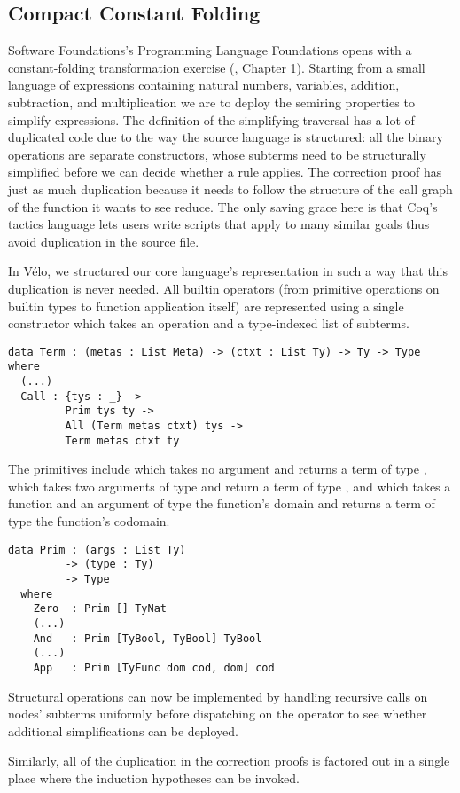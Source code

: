 \subsection{Compact Constant Folding}
\label{sec:design:constants}

Software Foundations's Programming Language Foundations
opens with a constant-folding transformation
exercise (\cite{Pierce:SF2}, Chapter 1).
%
Starting from a small language of expressions containing natural numbers,
variables, addition, subtraction, and multiplication we are to deploy the
semiring properties to simplify expressions.
%
The definition of the simplifying traversal has a lot of duplicated code
due to the way the source language is structured: all the binary operations
are separate constructors, whose subterms need to be structurally simplified
before we can decide whether a rule applies.
%
The correction proof has just as much duplication because it needs to follow
the structure of the call graph of the function it wants to see reduce.
%
The only saving grace here is that Coq's tactics language lets users write
scripts that apply to many similar goals thus avoid duplication in the source
file.

In Vélo, we structured our core language's representation in such a way that
this duplication is never needed.
%
All builtin operators (from primitive operations on builtin types to function
application itself) are represented using a single  constructor
which takes an operation and a type-indexed list of subterms.

\begin{verbatim}
data Term : (metas : List Meta) -> (ctxt : List Ty) -> Ty -> Type where
  (...)
  Call : {tys : _} ->
         Prim tys ty ->
         All (Term metas ctxt) tys ->
         Term metas ctxt ty
\end{verbatim}

The primitives include
%
 which takes no argument and returns a term of type ,
%
 which takes two arguments of type  and return a term
of type ,
%
and  which takes a function and an argument of type the function's domain
and returns a term of type the function's codomain.

\begin{verbatim}
data Prim : (args : List Ty)
         -> (type : Ty)
         -> Type
  where
    Zero  : Prim [] TyNat
    (...)
    And   : Prim [TyBool, TyBool] TyBool
    (...)
    App   : Prim [TyFunc dom cod, dom] cod
\end{verbatim}

Structural operations can now be implemented by handling
recursive calls on  nodes' subterms uniformly
before dispatching on the operator to see whether additional
simplifications can be deployed.

Similarly, all of the duplication in the correction proofs is
factored out in a single place where the induction hypotheses
can be invoked.


